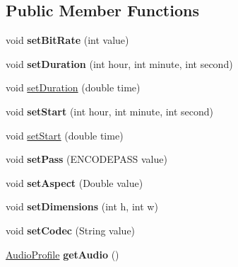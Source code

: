 \subsection*{Public Member Functions}
\begin{DoxyCompactItemize}
\item 
\hypertarget{classvideo_1_1_video_profile_a45af74f7b83f89f90aab726db796047e}{
void {\bfseries setBitRate} (int value)}
\label{classvideo_1_1_video_profile_a45af74f7b83f89f90aab726db796047e}

\item 
\hypertarget{classvideo_1_1_video_profile_a190e8832c69295b46dee9c34206645d8}{
void {\bfseries setDuration} (int hour, int minute, int second)}
\label{classvideo_1_1_video_profile_a190e8832c69295b46dee9c34206645d8}

\item 
void \hyperlink{classvideo_1_1_video_profile_a9aabb5f252d2fc467c74d3123864d94a}{setDuration} (double time)
\item 
\hypertarget{classvideo_1_1_video_profile_ae45387e20db1d9bdcfc4b415fbd5f03f}{
void {\bfseries setStart} (int hour, int minute, int second)}
\label{classvideo_1_1_video_profile_ae45387e20db1d9bdcfc4b415fbd5f03f}

\item 
void \hyperlink{classvideo_1_1_video_profile_a04d4b32f8f8634cb85d44a48a0bf4206}{setStart} (double time)
\item 
\hypertarget{classvideo_1_1_video_profile_a830cf2659e50fe7efbd43075e95099eb}{
void {\bfseries setPass} (ENCODEPASS value)}
\label{classvideo_1_1_video_profile_a830cf2659e50fe7efbd43075e95099eb}

\item 
\hypertarget{classvideo_1_1_video_profile_a3c6a6649fd9541568642d2cc1d7e27e3}{
void {\bfseries setAspect} (Double value)}
\label{classvideo_1_1_video_profile_a3c6a6649fd9541568642d2cc1d7e27e3}

\item 
\hypertarget{classvideo_1_1_video_profile_ad15c71c642d956a6a86bdaed565fc6cc}{
void {\bfseries setDimensions} (int h, int w)}
\label{classvideo_1_1_video_profile_ad15c71c642d956a6a86bdaed565fc6cc}

\item 
\hypertarget{classvideo_1_1_video_profile_a95ba1b3043ba85255ec3d4f06c96cc86}{
void {\bfseries setCodec} (String value)}
\label{classvideo_1_1_video_profile_a95ba1b3043ba85255ec3d4f06c96cc86}

\item 
\hypertarget{classvideo_1_1_video_profile_a46c05dc58b177b83356823f6cac11aaf}{
\hyperlink{classvideo_1_1_audio_profile}{AudioProfile} {\bfseries getAudio} ()}
\label{classvideo_1_1_video_profile_a46c05dc58b177b83356823f6cac11aaf}


\end{DoxyCompactItemize}
